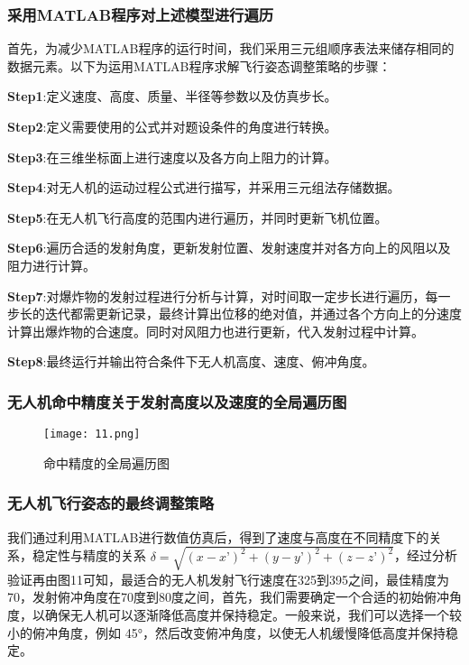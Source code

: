 \documentclass[normalsize]{ctexart}
\begin{document}
	\subsubsection{采用MATLAB程序对上述模型进行遍历}
		首先，为减少MATLAB程序的运行时间，我们采用三元组顺序表法\cite{ref4}来储存相同的数据元素。以下为运用MATLAB程序求解飞行姿态调整策略的步骤：
		\par \textbf{Step1}:定义速度、高度、质量、半径等参数以及仿真步长。
		\par \textbf{Step2}:定义需要使用的公式并对题设条件的角度进行转换。
		\par \textbf{Step3}:在三维坐标面上进行速度以及各方向上阻力的计算。
		\par \textbf{Step4}:对无人机的运动过程公式进行描写，并采用三元组法存储数据。
		\par \textbf{Step5}:在无人机飞行高度的范围内进行遍历，并同时更新飞机位置。
		\par \textbf{Step6}:遍历合适的发射角度，更新发射位置、发射速度并对各方向上的风阻以及阻力进行计算。
		\par \textbf{Step7}:对爆炸物的发射过程进行分析与计算，对时间取一定步长进行遍历，每一步长的迭代都需更新记录，最终计算出位移的绝对值，并通过各个方向上的分速度计算出爆炸物的合速度。同时对风阻力也进行更新，代入发射过程中计算。
		\par \textbf{Step8}:最终运行并输出符合条件下无人机高度、速度、俯冲角度。
	\subsubsection{无人机命中精度关于发射高度以及速度的全局遍历图}
	\begin{figure}[h]
		
		\centering
		\texttt{[image: 11.png]}
		\caption{命中精度的全局遍历图}
		
	\end{figure}

\subsubsection{无人机飞行姿态的最终调整策略}
 我们通过利用MATLAB进行数值仿真后，得到了速度与高度在不同精度下的关系，稳定性与精度的关系	$\delta=\sqrt{(x-x’)^2 + (y-y’)^2 + (z-z’)^2}$，经过分析验证再由图11可知，最适合的无人机发射飞行速度在325到395之间，最佳精度为70，发射俯冲角度在70度到80度之间，首先，我们需要确定一个合适的初始俯冲角度，以确保无人机可以逐渐降低高度并保持稳定。一般来说，我们可以选择一个较小的俯冲角度，例如 45°，然后改变俯冲角度，以使无人机缓慢降低高度并保持稳定。
 
\end{document}
